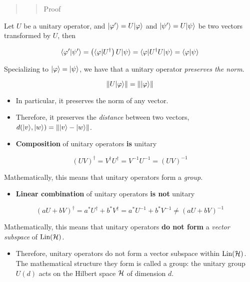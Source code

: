 \documentclass[11pt]{article}
\providecommand{\tightlist}{%
      \setlength{\itemsep}{0pt}\setlength{\parskip}{0pt}}
\begin{document}
\begin{quote}
\begin{quote}
Proof
\end{quote}
\end{quote}

Let \(U\) be a unitary operator, and
\(|\varphi'\rangle = U |\varphi\rangle\) and \(|\psi'\rangle = U |\psi\rangle\)
be two vectors transformed by \(U\), then

\[
\langle \varphi'|\psi'\rangle = \left( \langle \varphi| U^\dagger \right) U |\psi\rangle = \langle \varphi| U^\dagger U |\psi\rangle = \langle \varphi|\psi\rangle
\]

Specializing to \(|\varphi\rangle = |\psi\rangle\), we have that a unitary
operator \emph{preserves the norm}.

\[
\| U |\varphi\rangle \| = \| |\varphi\rangle \|
\]

    \begin{itemize}
\item
  In particular, it preserves the norm of any vector.
\item
  Therefore, it preserves the \emph{distance} between two vectors,
  \(d(|v\rangle, |w\rangle) = \| |v\rangle - |w\rangle \|\).
\end{itemize}

    \begin{itemize}
\tightlist
\item
  \textbf{Composition} of unitary operators \textbf{is} unitary
\end{itemize}

\[
(UV)^\dagger = V^\dagger U^\dagger = V^{-1} U^{-1} = (UV)^{-1}
\]

    Mathematically, this means that unitary operators form a \emph{group}.

    \begin{itemize}
\tightlist
\item
  \textbf{Linear combination} of unitary operators \textbf{is not}
  unitary
\end{itemize}

\[
(a U + b V)^\dagger = a^* U^\dagger + b^* V^\dagger = a^* U^{-1} + b^* V^{-1} \neq (a U + b V)^{-1}
\]

    Mathematically, this means that unitary operators \textbf{do not form} a
\emph{vector subspace} of \(\hbox{Lin}({\cal H})\).

    \begin{itemize}
\tightlist
\item
  Therefore, unitary operators do not form a vector subspace within
  \(\hbox{Lin}({\cal H})\). The mathematical structure they form is called a
  group: the unitary group \(U(d)\) acts on the Hilbert space \({\cal H}\)
  of dimension \(d\).
\end{itemize}
\end{document}
